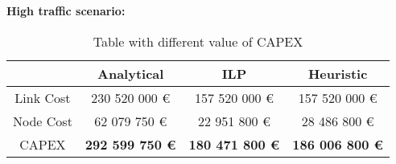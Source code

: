 \vspace{11pt}
\textbf{High traffic scenario:}\\

\begin{table}[h!]
\centering
\begin{tabular}{| c | c | c | c |}
 \hline
   & Analytical & ILP & Heuristic \\
 \hline\hline
 Link Cost & 230 520 000 \euro & 157 520 000 \euro & 157 520 000 \euro \\
 Node Cost & 62 079 750 \euro & 22 951 800 \euro & 28 486 800 \euro \\
 CAPEX & \textbf{292 599 750 \euro} & \textbf{180 471 800 \euro} & \textbf{186 006 800 \euro} \\
 \hline
\end{tabular}
\caption{Table with different value of CAPEX }
\label{table_comparative_transp_sur_ref_3}
\end{table}


